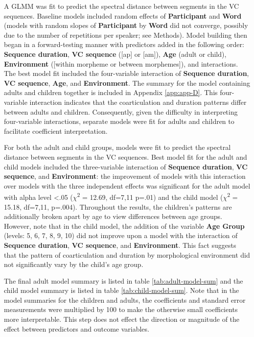 \documentclass[a4paper,man,floatsintext,natbib,donotrepeattitle, apacite]{apa6}
\begin{document}
A GLMM was fit to predict the spectral distance between segments in the VC sequences. Baseline models included random effects of \textbf{Participant} and \textbf{Word} (models with random slopes of \textbf{Participant} by \textbf{Word} did not converge, possibly due to the number of repetitions per speaker; see Methods). Model building then began in a forward-testing manner with predictors added in the following order: \textbf{Sequence duration}, \textbf{VC sequence} ({[}ap{]} or {[}am{]}), \textbf{Age} (adult or child), \textbf{Environment} ({[}within morpheme or between morphemes{]}), and interactions. The best model fit included the four-variable interaction of \textbf{Sequence duration}, \textbf{VC sequence}, \textbf{Age}, and \textbf{Environment}. The summary for the model containing adults and children together is included in Appendix \ref{app:app-D}. This four-variable interaction indicates that the coarticulation and duration patterns differ between adults and children. Consequently, given the difficulty in interpreting four-variable interactions, separate models were fit for adults and children to facilitate coefficient interpretation. 

For both the adult and child groups, models were fit to predict the spectral distance between segments in the VC sequences. Best model fit for the adult and child models included the three-variable interaction of \textbf{Sequence duration}, \textbf{VC sequence}, and \textbf{Environment}: the improvement of models with this interaction over models with the three independent effects was significant for the adult model with alpha level \textless.05 (\(\chi\)\textsuperscript{2} = 12.69, df=7,11 p=.01) and the child model (\(\chi\)\textsuperscript{2} = 15.18, df=7,11, p=.004). Throughout the results, the children's patterns are additionally broken apart by age to view differences between age groups. However, note that in the child model, the addition of the variable \textbf{Age Group} (levels: 5, 6, 7, 8, 9, 10) did not improve upon a model with the interaction of \textbf{Sequence duration}, \textbf{VC sequence}, and \textbf{Environment}. This fact suggests that the pattern of coarticulation and duration by morphological environment did not significantly vary by the child's age group.

The final adult model summary is listed in table \ref{tab:adult-model-sum} and the child model summary is listed in table \ref{tab:child-model-sum}. Note that in the model summaries for the children and adults, the coefficients and standard error measurements were multiplied by 100 to make the otherwise small coefficients more interpretable. This step does not effect the direction or magnitude of the effect between predictors and outcome variables.
\end{document}
